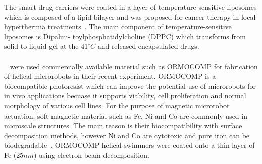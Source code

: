 \documentclass[12pt,a4paper,titlepage]{report}
\begin{document}
The smart drug carriers were coated in a layer of temperature-sensitive liposomes which is composed 
of a lipid bilayer and was proposed for cancer therapy in local hyperthermia treatments~\citep{qiu2014artificial}.
The main component of temperature-sensitive liposomes is Dipalmi- toylphosphatidylcholine (DPPC) which
transforms from solid to liquid gel at the $41^{\circ} C$ and released encapsulated drugs.

\paragraph{}
 \citeauthor{qiu2014noncytotoxic}~\citep{qiu2014noncytotoxic} were used commercially available material such as ORMOCOMP
 for fabrication of helical microrobots in their recent experiment. ORMOCOMP is a biocompatible photoresist which
can improve the potential use of microrobots for in vivo applications becuase it supports viability, cell proliferation
 and normal morphology of various cell lines. For the purpose of magnetic microrobot actuation, soft magnetic material
such as Fe, Ni and Co are commonly used in microscale structures. The main reason is their biocompatibility
with surface decomposition methods, however Ni and Co are cytotoxic and pure iron can be biodegradable~\citep{qiu2014noncytotoxic}.
ORMOCOMP helical swimmers were coated onto a thin layer of Fe ($25 nm$) using electron beam decomposition.
  
\end{document}
